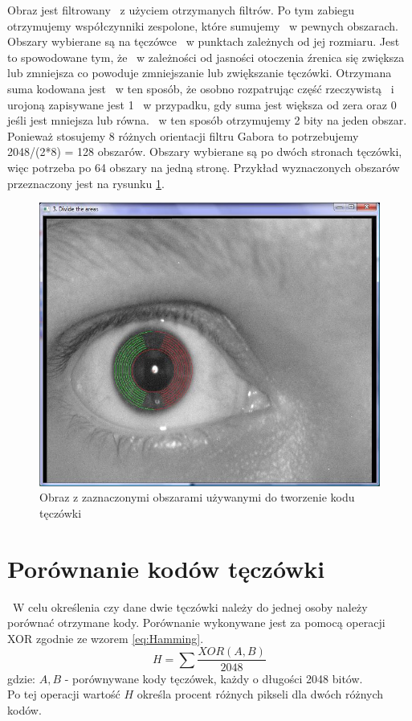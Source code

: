 Obraz jest filtrowany ~z użyciem otrzymanych filtrów. Po tym zabiegu otrzymujemy współczynniki zespolone, które sumujemy ~w pewnych obszarach. Obszary wybierane są na tęczówce ~w punktach zależnych od jej rozmiaru. Jest to spowodowane tym, że ~w zależności od jasności otoczenia źrenica się zwiększa lub zmniejsza co powoduje zmniejszanie lub zwiększanie tęczówki. Otrzymana suma kodowana jest ~w ten sposób, że osobno rozpatrując część rzeczywistą ~i urojoną zapisywane jest 1 ~w przypadku, gdy suma jest większa od zera oraz 0 jeśli jest mniejsza lub równa. ~w ten sposób otrzymujemy 2 bity na jeden obszar. Ponieważ stosujemy 8 różnych orientacji filtru Gabora to potrzebujemy 2048/(2*8) = 128 obszarów. Obszary wybierane są po dwóch stronach tęczówki, więc potrzeba po 64 obszary na jedną stronę. Przykład wyznaczonych obszarów przeznaczony jest na rysunku \ref{fig:obszaryNasze}.
\begin{figure}
\begin{center}
\includegraphics[scale=0.5]{obszary.jpg}
\caption{Obraz z zaznaczonymi obszarami używanymi do tworzenie kodu tęczówki}
\label{fig:obszaryNasze}
\end{center}
\end{figure}

\section{Porównanie kodów tęczówki}
\label{sec:porownanieKodow}
~W celu określenia czy dane dwie tęczówki należy do jednej osoby należy porównać otrzymane kody. Porównanie wykonywane jest za pomocą operacji XOR zgodnie ze wzorem \ref{eq:Hamming}.
\begin{equation}
\label{eq:Hamming}
H = \sum \frac{XOR(A,B)}{2048}
\end{equation}
gdzie:
$A, B$ - porównywane kody tęczówek, każdy o długości 2048 bitów.\\
Po tej operacji wartość $H$ określa procent różnych pikseli dla dwóch różnych kodów.

